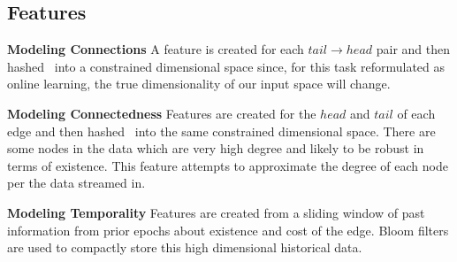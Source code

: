 \documentclass{article} %
\begin{document}




\subsection{Features}

\textbf{Modeling Connections} A feature is created for each $tail
\rightarrow head$ pair and then hashed~\cite{hash} into a constrained dimensional
space since, for this task reformulated as online learning, the true
dimensionality of our input space will change.

\textbf{Modeling Connectedness} Features are created for the $head$ and
$tail$ of each edge and then hashed~\cite{hash} into the same constrained dimensional
space.  There are some nodes in the data which are very high degree and
likely to be robust in terms of existence.  This feature attempts to
approximate the degree of each node per the data streamed in.

\textbf{Modeling Temporality} Features are created from a sliding window of
past information from prior epochs about existence and cost of the edge.
Bloom filters are used to compactly store this high dimensional historical
data.
\end{document}
